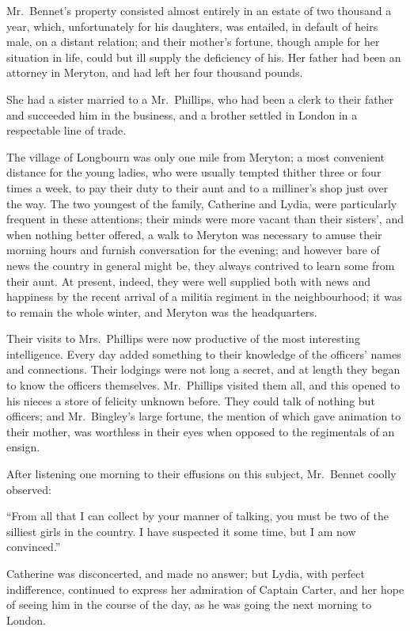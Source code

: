 \documentclass[12pt,english]{book}
\begin{document}
Mr.\ Bennet's property consisted almost entirely in an estate of
two thousand a year, which, unfortunately for his daughters, was entailed,
in default of heirs male, on a distant relation; and their mother's
fortune, though ample for her situation in life, could but ill supply
the deficiency of his. Her father had been an attorney in Meryton,
and had left her four thousand pounds.

She had a sister married to a Mr.\ Phillips, who had been a clerk
to their father and succeeded him in the business, and a brother settled
in London in a respectable line of trade.

The village of Longbourn was only one mile from Meryton; a most convenient
distance for the young ladies, who were usually tempted thither three
or four times a week, to pay their duty to their aunt and to a milliner's
shop just over the way. The two youngest of the family, Catherine
and Lydia, were particularly frequent in these attentions; their minds
were more vacant than their sisters', and when nothing better offered,
a walk to Meryton was necessary to amuse their morning hours and furnish
conversation for the evening; and however bare of news the country
in general might be, they always contrived to learn some from their
aunt. At present, indeed, they were well supplied both with news and
happiness by the recent arrival of a militia regiment in the neighbourhood;
it was to remain the whole winter, and Meryton was the headquarters.

Their visits to Mrs.\ Phillips were now productive of the most interesting
intelligence. Every day added something to their knowledge of the
officers' names and connections. Their lodgings were not long a secret,
and at length they began to know the officers themselves. Mr.\ Phillips
visited them all, and this opened to his nieces a store of felicity
unknown before. They could talk of nothing but officers; and Mr.\ Bingley's
large fortune, the mention of which gave animation to their mother,
was worthless in their eyes when opposed to the regimentals of an
ensign.

After listening one morning to their effusions on this subject, Mr.\ 
Bennet coolly observed:

{}``From all that I can collect by your manner of talking, you must
be two of the silliest girls in the country. I have suspected it some
time, but I am now convinced.''

Catherine was disconcerted, and made no answer; but Lydia, with perfect
indifference, continued to express her admiration of Captain Carter,
and her hope of seeing him in the course of the day, as he was going
the next morning to London.
\end{document}
